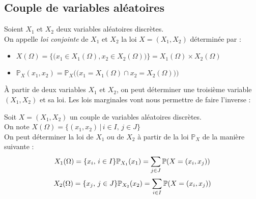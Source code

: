 \documentclass[11pt,a4paper,fleqn,pdftex]{report}
\begin{document}
\subsection{Couple de variables aléatoires} %
\label{sub:couple_de_variables_aleatoires}
\begin{dfn}
     Soient $X_1$ et $X_2$ deux variables aléatoires discrètes. \\
     On appelle \emph{loi conjointe} de $X_1$ et $X_2$ la loi $X=(X_1,X_2)$ déterminée par :
     \begin{itemize}
         \item $X(\Omega ) = \bigg\lbrace \Big(x_1\in X_1(\Omega ), x_2\in X_2(\Omega )\Big)\bigg\rbrace = X_1(\Omega )\times X_2(\Omega )$
         \item $\mathbb{P}_X(x_1,x_2) = \mathbb{P}_X\bigg(\Big( x_1 = X_1(\Omega ) \cap x_2 = X_2(\Omega )\Big)\bigg)$
     \end{itemize}
\end{dfn}
À partir de deux variables $X_1$ et $X_2$, on peut déterminer une troisième variable $(X_1,X_2)$ et sa loi. Les lois marginales vont nous permettre de faire l'inverse :
\begin{theorem}
     Soit $X = (X_1 , X_2)$ un couple de variables aléatoires discrètes.\\
     On note $X(\Omega ) = \Big\lbrace (x_1, x_2)\, |\, i\in I,\, j\in J \Big\rbrace$ \\
     On peut déterminer la loi de $X_1$ ou de $X_2$ à partir de la loi $\mathbb{P}_X$ de la manière suivante : 
     \begin{equation}
     X_1(\Omega ) = \lbrace x_i ,\, i\in I\rbrace \\ \mathbb{P}_{X_1}(x_1) = \sum_{j\in J} \mathbb{P}(X = (x_i, x_j)) 
     \end{equation}
     \begin{equation}
     X_2(\Omega ) = \lbrace x_j ,\, j\in J\rbrace \\ \mathbb{P}_{X_2}(x_2) = \sum_{i\in I} \mathbb{P}(X = (x_i, x_j)) 
     \end{equation}
\end{theorem}
\end{document}

